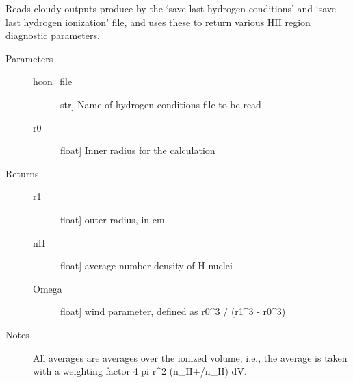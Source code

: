\documentclass[letterpaper,10pt,english]{sphinxmanual}
\begin{document}

\begin{fulllineitems}
\label{\detokenize{cloudy:slugpy.cloudy.read_cloudy_hcon}}
Reads cloudy outputs produce by the ‘save last hydrogen
conditions’ and ‘save last hydrogen ionization’ file, and uses
these to return various HII region diagnostic parameters.
\begin{description}
\item[{Parameters}] \leavevmode\begin{description}
\item[{hcon\_file}] \leavevmode{[}str{]}
Name of hydrogen conditions file to be read

\item[{r0}] \leavevmode{[}float{]}
Inner radius for the calculation

\end{description}

\item[{Returns}] \leavevmode\begin{description}
\item[{r1}] \leavevmode{[}float{]}
outer radius, in cm

\item[{nII}] \leavevmode{[}float{]}
average number density of H nuclei

\item[{Omega}] \leavevmode{[}float{]}
wind parameter, defined as r0\textasciicircum{}3 / (r1\textasciicircum{}3 - r0\textasciicircum{}3)

\end{description}

\item[{Notes}] \leavevmode
All averages are averages over the ionized volume, i.e., the
average is taken with a weighting factor 4 pi r\textasciicircum{}2 (n\_H+/n\_H) dV.

\end{description}

\end{fulllineitems}

\end{document}
